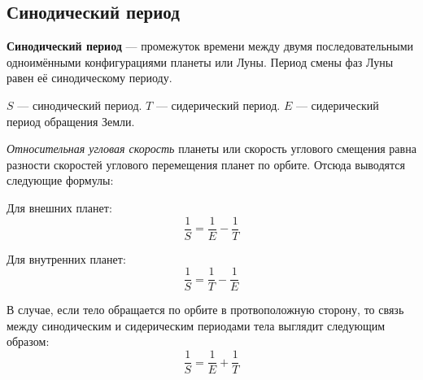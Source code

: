 \subsection{Синодический период}

\textbf{Синодический период} --- промежуток времени между двумя последовательными одноимёнными конфигурациями планеты или Луны. Период смены фаз Луны равен её синодическому периоду.

$S$ --- синодический период. $T$ --- сидерический период. $E$ --- сидерический период обращения Земли.

\textit{Относительная угловая скорость} планеты или скорость углового смещения равна разности скоростей углового перемещения планет по орбите. Отсюда выводятся следующие формулы:

Для внешних планет:
\begin{equation}\frac1S=\frac1E-\frac1T
\end{equation}

Для внутренних планет:
\begin{equation}\frac1S=\frac1T-\frac1E
\end{equation}

В случае, если тело обращается по орбите в протвоположную сторону, то связь между синодическим и сидерическим периодами тела выглядит следующим образом:
\begin{equation}\frac1S=\frac1E+\frac1T
\end{equation}